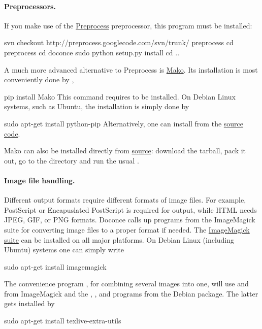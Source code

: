 \documentclass[%
oneside,                 %
final,                   %
chapterprefix=true,      %
open=right               %
10pt]{book}
\begin{document}
\paragraph{Preprocessors.}
If you make use of the \href{{http://code.google.com/p/preprocess}}{Preprocess}
preprocessor, this program must be installed:

\bsys
svn checkout http://preprocess.googlecode.com/svn/trunk/ preprocess
cd preprocess
cd doconce
sudo python setup.py install
cd ..
\esys

A much more advanced alternative to Preprocess is
\href{{http://www.makotemplates.org}}{Mako}. Its installation is most
conveniently done by ,

\bsys
pip install Mako
\esys
This command requires  to be installed. On Debian Linux systems,
such as Ubuntu, the installation is simply done by

\bsys
sudo apt-get install python-pip
\esys
Alternatively, one can install from the  \href{{http://pypi.python.org/pypi/pip}}{source code}.

Mako can also be installed directly from
\href{{http://www.makotemplates.org/download.html}}{source}: download the
tarball, pack it out, go to the directory and run
the usual .

\paragraph{Image file handling.}
Different output formats require different formats of image files.
For example, PostScript or Encapuslated PostScript is required for 
output, while HTML needs JPEG, GIF, or PNG formats.
Doconce calls up programs from the ImageMagick suite for converting
image files to a proper format if needed. The \href{{http://www.imagemagick.org/script/index.php}}{ImageMagick suite} can be installed on all major platforms.
On Debian Linux (including Ubuntu) systems one can simply write

\bsys
sudo apt-get install imagemagick
\esys

The convenience program , for combining several
images into one, will use  and  from ImageMagick and
the , , and  programs from the 
Debian package. The latter gets installed by

\bsys
sudo apt-get install texlive-extra-utils
\esys
\end{document}
